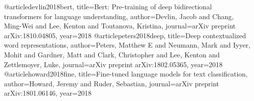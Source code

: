 @article{devlin2018bert,
  title={Bert: Pre-training of deep bidirectional transformers for language understanding},
  author={Devlin, Jacob and Chang, Ming-Wei and Lee, Kenton and Toutanova, Kristina},
  journal={arXiv preprint arXiv:1810.04805},
  year={2018}
}
@article{peters2018deep,
  title={Deep contextualized word representations},
  author={Peters, Matthew E and Neumann, Mark and Iyyer, Mohit and Gardner, Matt and Clark, Christopher and Lee, Kenton and Zettlemoyer, Luke},
  journal={arXiv preprint arXiv:1802.05365},
  year={2018}
}
@article{howard2018fine,
  title={Fine-tuned language models for text classification},
  author={Howard, Jeremy and Ruder, Sebastian},
  journal={arXiv preprint arXiv:1801.06146},
  year={2018}
}
